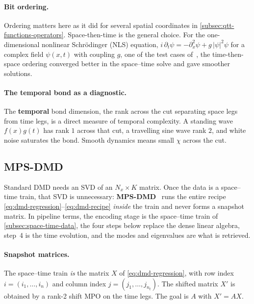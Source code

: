\paragraph{Bit ordering.}
Ordering matters here as it did for several spatial coordinates in
\cref{subsec:qtt-functions-operators}. Space-then-time is the general choice.
For the one-dimensional nonlinear Schr\"odinger (NLS) equation,
$i\,\partial_t\psi = -\partial_x^2\psi + g\,\lvert\psi\rvert^2\psi$ for a
complex field $\psi(x,t)$ with coupling $g$, one of the test cases
of~\cite{Peddinti2025a}, the time-then-space ordering converged better in the
space--time solve and gave smoother solutions.

\paragraph{The temporal bond as a diagnostic.}
The \textbf{temporal} bond dimension, the rank across the cut separating space
legs from time legs, is a direct measure of temporal complexity. A standing wave
$f(x)g(t)$ has rank $1$ across that cut, a travelling sine wave rank $2$, and
white noise saturates the bond. Smooth dynamics means small $\chi$ across the
cut.

\subsection{MPS-DMD}
\label{subsec:mps-dmd}

Standard DMD needs an SVD of an $N_x \times K$ matrix. Once the data is a
space--time train, that SVD is unnecessary: \textbf{MPS-DMD}~\cite{Peddinti2025a}
runs the entire recipe \eqref{eq:dmd-regression}--\eqref{eq:dmd-recipe}
\emph{inside} the train and never forms a snapshot matrix. In pipeline terms,
the encoding stage is the space--time train of \cref{subsec:space-time-data},
the four steps below replace the dense linear algebra, step~4 is the time
evolution, and the modes and eigenvalues are what is retrieved.

\paragraph{Snapshot matrices.}
The space--time train \emph{is} the matrix $X$ of \eqref{eq:dmd-regression},
with row index $i = (i_1,\dots,i_n)$ and column index
$j = (j_1,\dots,j_{n_t})$. The shifted matrix $X'$ is obtained by a rank-2
shift MPO on the time legs. The goal is $A$ with $X' = AX$.

